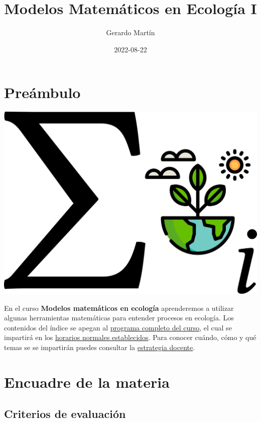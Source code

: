 \documentclass[
]{book}
\title{Modelos Matemáticos en Ecología I}
\author{Gerardo Martín}
\date{2022-08-22}
\begin{document}
\maketitle

{
\setcounter{tocdepth}{1}
\tableofcontents
}
\hypertarget{preuxe1mbulo}{%
\chapter{Preámbulo}\label{preuxe1mbulo}}

\begin{center}\includegraphics[width=20.83in]{logo} \end{center}

En el curso \textbf{Modelos matemáticos en ecología} aprenderemos a utilizar algunas herramientas matemáticas para entender procesos en ecología. Los contenidos del índice se apegan al \href{Programa-curso.pdf}{programa completo del curso}, el cual se impartirá en los \href{Horario.pdf}{horarios normales establecidos}. Para conocer cuándo, cómo y qué temas se se impartirán puedes consultar la \href{Estrategia-docente.pdf}{estrategia docente}.

\hypertarget{encuadre-de-la-materia}{%
\chapter{Encuadre de la materia}\label{encuadre-de-la-materia}}

\hypertarget{criterios-de-evaluaciuxf3n}{%
\section{Criterios de evaluación}\label{criterios-de-evaluaciuxf3n}}
\end{document}
